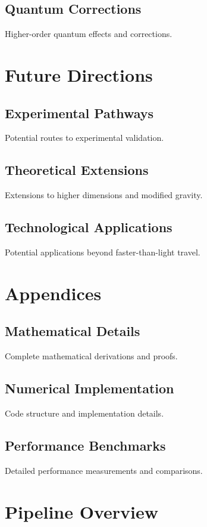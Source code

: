 \documentclass{article}
\begin{document}
\subsection{Quantum Corrections}
Higher-order quantum effects and corrections.

\section{Future Directions}

\subsection{Experimental Pathways}
Potential routes to experimental validation.

\subsection{Theoretical Extensions}
Extensions to higher dimensions and modified gravity.

\subsection{Technological Applications}
Potential applications beyond faster-than-light travel.

\section{Appendices}

\subsection{Mathematical Details}
Complete mathematical derivations and proofs.

\subsection{Numerical Implementation}
Code structure and implementation details.

\subsection{Performance Benchmarks}
Detailed performance measurements and comparisons.

\section{Pipeline Overview}
\end{document}
